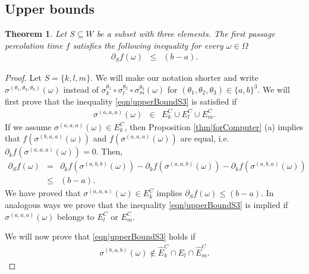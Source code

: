 \documentclass[reqno]{amsart}
\newtheorem{theorem}{Theorem}[section]
\begin{document}
\subsection{Upper bounds}\label{subs|U3}
\begin{theorem}\label{thm|upperBoundS3}
Let $S\subseteq W$ be a subset with three elements. The first passage percolation time $f$ satisfies the following inequality for every $\omega\in\Omega$
\begin{eqnarray}
\partial_Sf(\omega)&\leq& (b-a). \label{eqn|upperBoundS3}
\end{eqnarray}
\end{theorem}
\begin{proof} Let $S=\{k,l,m\}$. We will make our notation shorter and write $\sigma^{(\theta_1,\theta_2,\theta_3)}(\omega)$ instead of $\sigma_k^{\theta_1}\circ \sigma_l^{\theta_2}\circ\sigma_m^{\theta_3}(\omega)$ for $(\theta_1,\theta_2,\theta_3)\in\{a,b\}^3$.  We will first prove that the inequality \eqref{eqn|upperBoundS3} is satisfied if 
\begin{eqnarray}\sigma^{(a,a,a)}(\omega) &\in& E_k^C\cup E_l^C\cup E_m^C.
\label{eqn|conditionU3AAA}
\end{eqnarray} 
If we assume $\sigma^{(a,a,a)}(\omega)\in E_k^C$, then Proposition \ref{thm|forComputer} (a) implies that 
$f(\sigma^{(b,a,a)}(\omega))$ and $f(\sigma^{(a,a,a)}(\omega))$ are equal, i.e. $\partial_kf(\sigma^{(a,a,a)}(\omega))=0$. Then,
\begin{eqnarray*}
\partial_Sf(\omega)&=& \partial_kf(\sigma^{(a,b,b)}(\omega)) 
-\partial_kf(\sigma^{(a,a,b)}(\omega))-\partial_kf(\sigma^{(a,b,a)}(\omega)) \\
&\leq&(b-a).
\end{eqnarray*} 
We have proved that $\sigma^{(a,a,a)}(\omega)\in E_k^C$ implies $\partial_Sf(\omega)\leq (b-a)$. In analogous ways we prove that 
the inequality \eqref{eqn|upperBoundS3} is implied if $\sigma^{(a,a,a)}(\omega)$ belongs to $E_l^C$ or $E_m^C$. 

We will now prove that \eqref{eqn|upperBoundS3} holds if \begin{eqnarray}\sigma^{(b,a,b)}(\omega)\not\in \hat E_k^C\cap E_l\cap \hat E_m^C.
\label{eqn|conditionViolatedU3BAB}
\end{eqnarray}


\end{proof}
\end{document}
